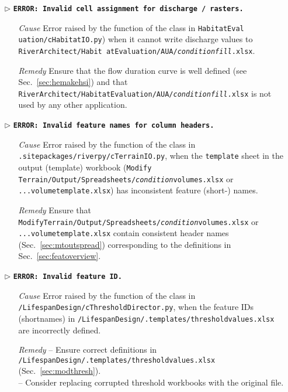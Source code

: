 \begin{itemize}
	\item[$\triangleright$]\textbf{\texttt{ERROR: Invalid cell assignment for discharge / rasters.}}
	\begin{itemize}
		\item[\textit{Cause}\hspace{0.27cm}] Error raised by the  function of the  class in \texttt{HabitatEval uation/cHabitatIO.py}) when it cannot write discharge values to \texttt{RiverArchitect/Habit atEvaluation/AUA/\textit{condition}{\myUnderscore}\textit{fill}.xlsx}.
		\item[\textit{Remedy}] Ensure that the flow duration curve is well defined (see Sec.~\ref{sec:hemakehsi}) and that \texttt{RiverArchitect/HabitatEvaluation/AUA/\textit{condition}{\myUnderscore}\textit{fill}.xlsx} is not used by any other application.\\
	\end{itemize}	
	
	\item[$\triangleright$]\textbf{\texttt{ERROR: Invalid feature names for column headers.}}
	\begin{itemize}
		\item[\textit{Cause}\hspace{0.27cm}] Error raised by the  function of the  class in \texttt{.site{\myUnderscore}packages/riverpy/cTerrainIO.py}, when the \texttt{template} sheet in the output (template) workbook (\texttt{Modify Terrain/Output/Spreadsheets/\textit{condition}{\myUnderscore}volumes.xlsx} or \texttt{...volume{\myUnderscore}template.xlsx}) has inconsistent feature (short-) names.
		\item[\textit{Remedy}] Ensure that \texttt{ModifyTerrain/Output/Spreadsheets/\textit{condition}{\myUnderscore}volumes.xlsx} or \\\texttt{...volume{\myUnderscore}template.xlsx} contain consistent header names (Sec.~\ref{sec:mtoutspread}) corresponding to the definitions in Sec.~\ref{sec:featoverview}.\\
	\end{itemize}
	
	\item[$\triangleright$]\textbf{\texttt{ERROR: Invalid feature ID.}}
	\begin{itemize}
		\item[\textit{Cause}\hspace{0.27cm}] Error raised by the  function of the  class in \texttt{/LifespanDesign/cThresholdDirector.py}, when the feature IDs (shortnames) in \texttt{/LifespanDesign/.templates/threshold{\myUnderscore}values.xlsx} are incorrectly defined.
		\item[\textit{Remedy}] -- Ensure correct definitions in \texttt{/LifespanDesign/.templates/threshold{\myUnderscore}values.xlsx} (Sec.~\ref{sec:modthresh}).\\
								-- Consider replacing corrupted threshold workbooks with the original file.\\
	\end{itemize}
	

\end{itemize}
